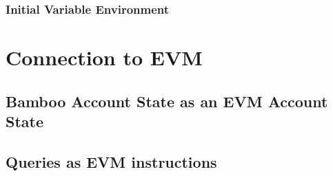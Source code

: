 \documentclass{book}
\begin{document}
\subsection{Initial Variable Environment}

\chapter{Connection to EVM}

\section{Bamboo Account State as an EVM Account State}

\section{Queries as EVM instructions}
\end{document}
